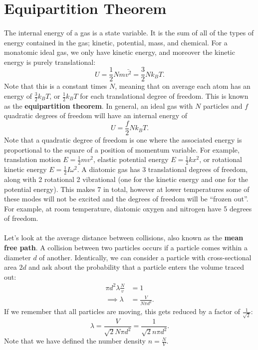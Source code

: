 \documentclass[../thermodynamics.tex]{subfiles}
\begin{document}
    \section{Equipartition Theorem}
        \paragraph{}
        The internal energy of a gas is a state variable.
        It is the sum of all of the types of energy contained in the gas; kinetic, potential, mass, and chemical.
        For a monatomic ideal gas, we only have kinetic energy, and moreover the kinetic energy is purely translational:
        \begin{equation}
            U=\frac{1}{2}Nm\bar{v^2}=\frac{3}{2}Nk_BT.
        \end{equation}
        Note that this is a constant times $N$, meaning that on average each atom has an energy of $\frac{3}{2}k_BT$, or $\frac{1}{2}k_BT$ for each translational degree of freedom.
        This is known as the \textbf{equipartition theorem}.
        In general, an ideal gas with $N$ particles and $f$ quadratic degrees of freedom will have an internal energy of
        \begin{equation}
            U=\frac{f}{2}Nk_BT.
        \end{equation}
        Note that a quadratic degree of freedom is one where the associated energy is proportional to the square of a position of momentum variable.
        For example, translation motion $E=\frac{1}{2}mv^2$, elastic potential energy $E=\frac{1}{2}kx^2$, or rotational kinetic energy $E=\frac{1}{2}I\omega^2$.
        A diatomic gas has 3 translational degrees of freedom, along with 2 rotational 2 vibrational (one for the kinetic energy and one for the potential energy).
        This makes 7 in total, however at lower temperatures some of these modes will not be excited and the degrees of freedom will be ``frozen out''.
        For example, at room temperature, diatomic oxygen and nitrogen have 5 degrees of freedom.

        \paragraph{}
        Let's look at the average distance between collisions, also known as the \textbf{mean free path}.
        A collision between two particles occurs if a particle comes within a diameter $d$ of another.
        Identically, we can consider a particle with cross-sectional area $2d$ and ask about the probability that a particle enters the volume traced out:
        \begin{align}
            \pi d^2\lambda\frac{N}{v}&=1\\
            \implies\lambda&=\frac{V}{N\pi d^2}.
        \end{align}
        If we remember that all particles are moving, this gets reduced by a factor of $\frac{1}{\sqrt{2}}$:
        \begin{equation}
            \lambda=\frac{V}{\sqrt{2}N\pi d^2}=\frac{1}{\sqrt{2}n\pi d^2}.
        \end{equation}
        Note that we have defined the number density $n=\frac{N}{V}$.
\end{document}
